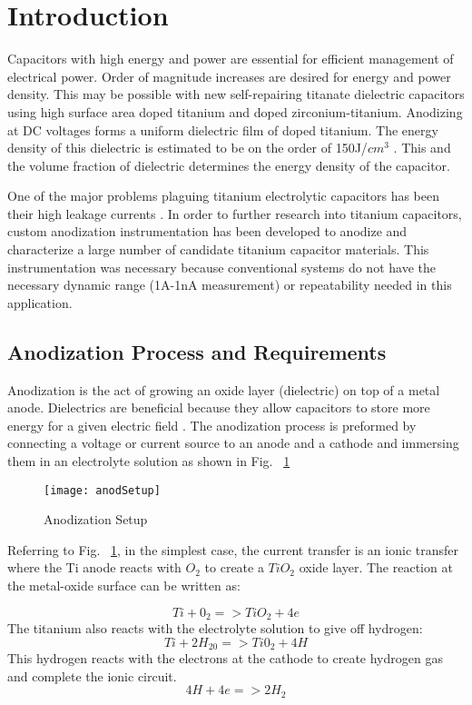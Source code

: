 \section{Introduction}

Capacitors with high energy and power are essential for efficient management of electrical power.  Order of magnitude increases are desired for energy and power density. This may be possible with new self-repairing titanate dielectric capacitors using high surface area doped titanium and doped zirconium-titanium.  Anodizing at DC voltages forms a uniform dielectric film of doped titanium. The energy density of this dielectric is estimated to be on the order of 150J/$cm^3$ \cite{tiSponge}. This and the volume fraction of dielectric determines the energy density of the capacitor.

One of the major problems plaguing titanium electrolytic capacitors has been their high leakage currents \cite{tiCharHag}. In order to further research into titanium capacitors, custom anodization instrumentation has been developed to anodize and characterize a large number of candidate titanium capacitor materials. This instrumentation was necessary because conventional systems do not have the necessary dynamic range (1A-1nA measurement) or repeatability needed in this application.


\subsection{Anodization Process and Requirements}

Anodization is the act of growing an oxide layer (dielectric) on top of a metal anode. Dielectrics are beneficial because they allow capacitors to store more energy for a given electric field \cite{cwruEncDie}. The anodization process is preformed by connecting a voltage or current source to an anode and a cathode and immersing them in an electrolyte solution as shown in Fig. ~\ref{fig:anodSetup}

\begin{figure}[here]
\centering
\texttt{[image: anodSetup]}
\caption{Anodization Setup}
\label{fig:anodSetup}
\end{figure}


Referring to Fig. ~\ref{fig:anodSetup}, in the simplest case, the current transfer is an ionic transfer where the Ti anode reacts with $O_{2}$ to create a $TiO_{2}$ oxide layer. The reaction at the metal-oxide surface can be written as:

\begin{equation}
Ti + 0_2 => TiO_2 + 4e
\end{equation}
The titanium also reacts with the electrolyte solution to give off hydrogen:
\begin{equation}
Ti + 2H_20 => Ti0_2 + 4H
\end{equation}
This hydrogen reacts with the electrons at the cathode to create hydrogen gas and complete the ionic circuit.
\begin{equation}
4H + 4e => 2H_2
\end{equation}

